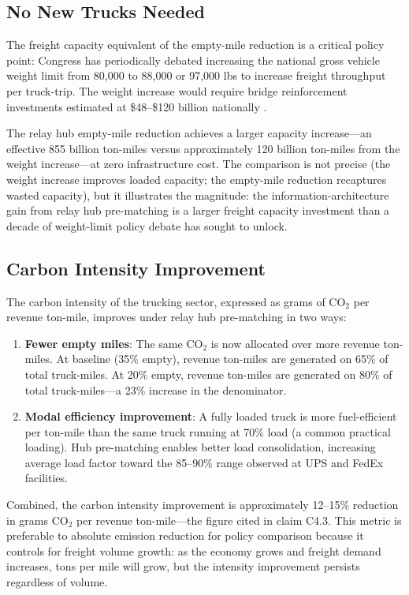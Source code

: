 \subsection{No New Trucks Needed}

The freight capacity equivalent of the empty-mile reduction is a critical policy point: Congress has periodically debated increasing the national gross vehicle weight limit from 80,000 to 88,000 or 97,000 lbs to increase freight throughput per truck-trip. The weight increase would require bridge reinforcement investments estimated at \$48--\$120 billion nationally \citep{FHWA_Bridge2022}.

The relay hub empty-mile reduction achieves a larger capacity increase---an effective 855 billion ton-miles versus approximately 120 billion ton-miles from the weight increase---at zero infrastructure cost. The comparison is not precise (the weight increase improves loaded capacity; the empty-mile reduction recaptures wasted capacity), but it illustrates the magnitude: the information-architecture gain from relay hub pre-matching is a larger freight capacity investment than a decade of weight-limit policy debate has sought to unlock.

\subsection{Carbon Intensity Improvement}

The carbon intensity of the trucking sector, expressed as grams of CO$_2$ per revenue ton-mile, improves under relay hub pre-matching in two ways:

\begin{enumerate}
  \item \textbf{Fewer empty miles}: The same CO$_2$ is now allocated over more revenue ton-miles. At baseline (35\% empty), revenue ton-miles are generated on 65\% of total truck-miles. At 20\% empty, revenue ton-miles are generated on 80\% of total truck-miles---a 23\% increase in the denominator.

  \item \textbf{Modal efficiency improvement}: A fully loaded truck is more fuel-efficient per ton-mile than the same truck running at 70\% load (a common practical loading). Hub pre-matching enables better load consolidation, increasing average load factor toward the 85--90\% range observed at UPS and FedEx facilities.
\end{enumerate}

Combined, the carbon intensity improvement is approximately 12--15\% reduction in grams CO$_2$ per revenue ton-mile---the figure cited in claim C4.3. This metric is preferable to absolute emission reduction for policy comparison because it controls for freight volume growth: as the economy grows and freight demand increases, tons per mile will grow, but the intensity improvement persists regardless of volume.
